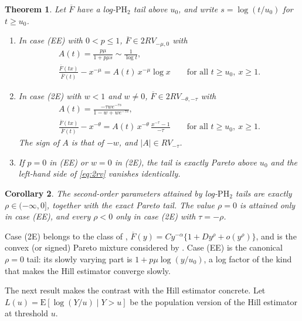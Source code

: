 \documentclass[12pt]{article}
\newtheorem{theorem}{Theorem}[section]
\newtheorem{corollary}[theorem]{Corollary}
\theoremstyle{definition}
\theoremstyle{remark}
\newcommand{\bF}{\overline{F}}
\newcommand{\E}{\mathrm{E}}
\newcommand{\PH}{\mathrm{PH}}
\begin{document}
\begin{theorem}\label{thm:2rv}
Let $\bF$ have a log-$\PH_2$ tail above $u_0$, and write $s=\log(t/u_0)$ for $t\ge u_0$.
\begin{enumerate}
\item[(a)] In case \textup{(EE)} with $0<p\le1$, $\bF\in 2RV_{-\mu,0}$ with
\begin{equation}\label{eq:AEE}
\begin{gathered}
A(t)=\frac{p\mu}{1+p\mu s}\sim\frac{1}{\log t},\\
\frac{\bF(tx)}{\bF(t)}-x^{-\mu}=A(t)\,x^{-\mu}\log x\qquad\text{for all } t\ge u_0,\ x\ge1 .
\end{gathered}
\end{equation}
\item[(b)] In case \textup{(2E)} with $w<1$ and $w\ne0$, $\bF\in 2RV_{-\theta,-\tau}$ with
\begin{equation}\label{eq:A2E}
\begin{gathered}
A(t)=\frac{-\tau w e^{-\tau s}}{1-w+we^{-\tau s}},\\
\frac{\bF(tx)}{\bF(t)}-x^{-\theta}=A(t)\,x^{-\theta}\,\frac{x^{-\tau}-1}{-\tau}\qquad\text{for all } t\ge u_0,\ x\ge1 .
\end{gathered}
\end{equation}
The sign of $A$ is that of $-w$, and $|A|\in RV_{-\tau}$.
\item[(c)] If $p=0$ in \textup{(EE)} or $w=0$ in \textup{(2E)}, the tail is exactly Pareto above $u_0$ and the left-hand side of \eqref{eq:2rv} vanishes identically.
\end{enumerate}
\end{theorem}

\begin{corollary}\label{cor:range}
The second-order parameters attained by log-$\PH_2$ tails are exactly $\rho\in(-\infty,0]$, together with the exact Pareto tail. The value $\rho=0$ is attained only in case \textup{(EE)}, and every $\rho<0$ only in case \textup{(2E)} with $\tau=-\rho$.
\end{corollary}

Case (2E) belongs to the class of \citet{Hall1982}, $\bF(y)=Cy^{-\alpha}\{1+Dy^{\rho}+o(y^{\rho})\}$, and is the convex (or signed) Pareto mixture considered by \citet{FeuervergerHall1999}. Case (EE) is the canonical $\rho=0$ tail: its slowly varying part is $1+p\mu\log(y/u_0)$, a log factor of the kind that makes the Hill estimator converge slowly.

The next result makes the contrast with the Hill estimator concrete. Let $L(u)=\E[\log(Y/u)\mid Y>u]$ be the population version of the Hill estimator at threshold $u$.
\end{document}
